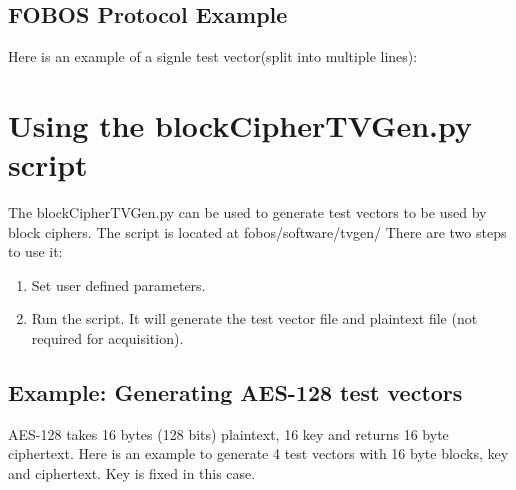 \documentclass[letterpaper,10pt,english]{sphinxmanual}
\begin{document}
\subsection{FOBOS Protocol Example}
\label{\detokenize{tvgen:fobos-protocol-example}}
Here is an example of a signle test vector(split into multiple lines):

\begin{sphinxVerbatim}[commandchars=\\\{\}]
 
 
 
 
 
 
 
 
 
 
\end{sphinxVerbatim}


\section{Using the blockCipherTVGen.py script}
\label{\detokenize{tvgen:using-the-blockciphertvgen-py-script}}
The blockCipherTVGen.py can be used to generate test vectors to be used by block ciphers. The script is located at fobos/software/tvgen/
There are two steps to use it:
\begin{enumerate}
\def\theenumi{\arabic{enumi}}
\def\labelenumi{\theenumi .}
\makeatletter\def\p@enumii{\p@enumi \theenumi .}\makeatother
\item {} 
Set user defined parameters.

\item {} 
Run the script. It will generate the test vector file and plaintext file (not required for acquisition).

\end{enumerate}


\subsection{Example: Generating AES-128 test vectors}
\label{\detokenize{tvgen:example-generating-aes-128-test-vectors}}
AES-128 takes 16 bytes (128 bits) plaintext, 16 key and returns 16 byte ciphertext.
Here is an example to generate 4 test vectors with 16 byte blocks, key and ciphertext. Key is fixed in this case.
\end{document}
